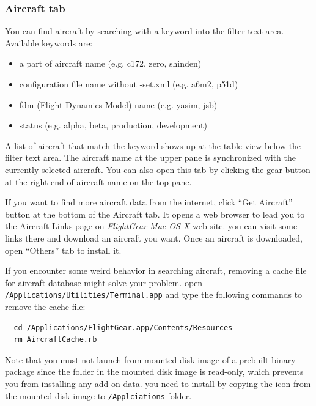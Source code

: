 \subsubsection{Aircraft tab}
You can find aircraft by searching with a keyword into the filter text area. Available keywords are:

\begin{itemize}
\item a part of aircraft name (e.g. c172, zero, shinden)
\item configuration file name without -set.xml (e.g. a6m2, p51d)
\item fdm (Flight Dynamics Model) name (e.g. yasim, jsb)
\item status (e.g. alpha, beta, production, development)
\end{itemize}
A list of aircraft that match the keyword shows up at the table view below the filter text area. The aircraft name at the upper pane is synchronized with the currently selected aircraft. You can also open this tab by clicking the gear button at the right end of aircraft name on the top pane.

If you want to find more aircraft data from the internet, click ``Get Aircraft'' button at the bottom of the Aircraft tab. It opens a web browser to lead you to the Aircraft Links page on \textit{FlightGear Mac OS X} web site. you can visit some links there and download an aircraft you want. Once an aircraft is downloaded, open ``Others'' tab to install it. 

If you encounter some weird behavior in searching aircraft, removing a cache file for aircraft database might solve your problem. open \\ \texttt{/Applications/Utilities/Terminal.app} and type the following commands to remove the cache file:

\begin{verbatim}
  cd /Applications/FlightGear.app/Contents/Resources
  rm AircraftCache.rb
\end{verbatim}

\medskip
Note that you must not launch \FlightGear{} from mounted disk image of a prebuilt binary package since the folder in the mounted disk image is read-only, which prevents you from installing any add-on data. you need to install \FlightGear{} by copying the \FlightGear{} icon from the mounted disk image to \texttt{/Applciations} folder.

